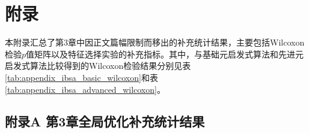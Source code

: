 \chapter{附录}
\renewcommand{\thetable}{A-\arabic{table}}
\setcounter{table}{0}

本附录汇总了第3章中因正文篇幅限制而移出的补充统计结果，主要包括Wilcoxon检验$p$值矩阵以及特征选择实验的补充指标。其中，与基础元启发式算法和先进元启发式算法比较得到的Wilcoxon检验结果分别见表\ref{tab:appendix_ibsa_basic_wilcoxon}和表\ref{tab:appendix_ibsa_advanced_wilcoxon}。

\section*{附录A 第3章全局优化补充统计结果}

\begingroup
\scriptsize
\setlength{\tabcolsep}{1.5pt}
